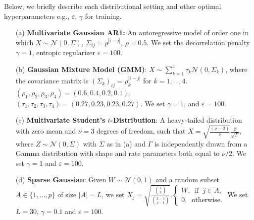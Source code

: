 \documentclass{article}
\theoremstyle{definition}
\begin{document}
Below, we briefly describe each distributional setting and other optimal hyperparameters e.g., $\varepsilon$, $\gamma$ for training. \begin{itemize}
    \item[(a)] \textbf{Multivariate Gaussian AR1:} An autoregressive model of order one in which $X\sim \mathcal N(0, \Sigma)$, $\Sigma_{ij}=\rho^{|i-j|}$, $\rho=0.5$. We set the decorrelation penalty $\gamma = 1$, entropic regularizer $\varepsilon = 100$.
    \item[(b)] \textbf{Gaussian Mixture Model (GMM)}: $X\sim \sum_{k=1}^4 \tau_k \mathcal N(0, \Sigma_k)$, where the covariance matrix is $(\Sigma_k)_{ij} = \rho_k^{|i-j|}$ for $k=1,\dots, 4$. $(\rho_1, \rho_2, \rho_3, \rho_4)= (0.6, 0.4, 0.2, 0.1)$,  $(\tau_1, \tau_2, \tau_3, \tau_4)=(0.27, 0.23, 0.23, 0.27)$.  We set $\gamma=1$, and $\varepsilon = 100$.
    \item[(c)] \textbf{Multivariate Student's $t$-Distribution}: A heavy-tailed distribution with zero mean and $\nu=3$ degrees of freedom, such that $X = \sqrt{\frac{(\nu -2)}{\nu}} \frac{ Z}{ \sqrt{\Gamma}}$, where $Z\sim \mathcal N(0, \Sigma)$ with $\Sigma$ as in (a) and $\Gamma$ is independently drawn from a Gamma distribution with shape and rate parameters both equal to $\nu/2$. We set $\gamma=1$ and $\varepsilon=100$.
    \item [(d)] \textbf{Sparse Gaussian}: Given $W\sim \mathcal N(0, 1)$ and a random subset $A \in \{1, \dots, p\}$ of size $|A| = L$, we set $X_j= \sqrt{\frac{\binom{L}{p}}{\binom{L-1}{p-1}}}. \begin{cases}W,\;\; \text{if}\;\; j\in A, \\ 0, \;\; \text{otherwise.}\end{cases}$ We set $L=30$, $\gamma = 0.1$ and $\varepsilon = 100$.
\end{itemize}
\end{document}
